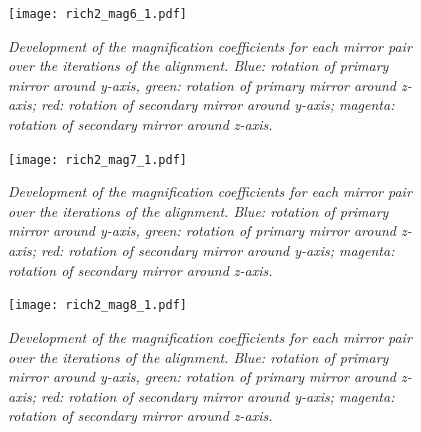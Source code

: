 \begin{figure}[!ht]
	\vspace*{-0.cm}
	\begin{center}
		\texttt{[image: rich2\_mag6\_1.pdf]}
		\vspace*{-1.5cm}
	\end{center}
	\caption{\textit{Development of the magnification coefficients for each mirror pair over the iterations of the alignment. Blue: rotation of primary mirror around y-axis, green: rotation of primary mirror around z-axis; red: rotation of secondary mirror around y-axis; magenta: rotation of secondary mirror around z-axis.}}
	\label{fig:rich2mag6_1}
\end{figure}
\begin{figure}[!ht]
	\vspace*{-0.cm}
	\begin{center}
		\texttt{[image: rich2\_mag7\_1.pdf]}
		\vspace*{-1.5cm}
	\end{center}
	\caption{\textit{Development of the magnification coefficients for each mirror pair over the iterations of the alignment. Blue: rotation of primary mirror around y-axis, green: rotation of primary mirror around z-axis; red: rotation of secondary mirror around y-axis; magenta: rotation of secondary mirror around z-axis.}}
	\label{fig:rich2mag7_1}
\end{figure}
\begin{figure}[!ht]
	\vspace*{-0.cm}
	\begin{center}
		\texttt{[image: rich2\_mag8\_1.pdf]}
		\vspace*{-1.5cm}
	\end{center}
	\caption{\textit{Development of the magnification coefficients for each mirror pair over the iterations of the alignment. Blue: rotation of primary mirror around y-axis, green: rotation of primary mirror around z-axis; red: rotation of secondary mirror around y-axis; magenta: rotation of secondary mirror around z-axis.}}
	\label{fig:rich2mag8_1}
\end{figure}



\clearpage




